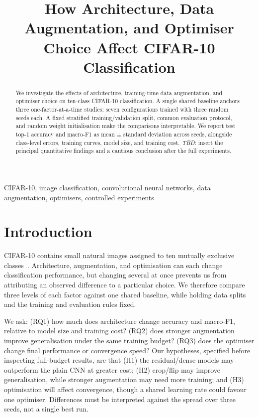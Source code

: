 \documentclass[conference,onecolumn]{IEEEtran}
\title{How Architecture, Data Augmentation, and Optimiser Choice Affect CIFAR-10 Classification}
\author{\IEEEauthorblockN{STUDENT-ID-1 \quad STUDENT-ID-2}
\IEEEauthorblockA{PGR207 Deep Learning, Autumn 2026}}
\newcommand{\tbd}{\textit{TBD}}
\begin{document}
\maketitle

\begin{abstract}
We investigate the effects of architecture, training-time data augmentation,
and optimiser choice on ten-class CIFAR-10 classification. A single shared
baseline anchors three one-factor-at-a-time studies: seven configurations
trained with three random seeds each. A fixed stratified training/validation
split, common evaluation protocol, and random weight initialisation make the
comparisons interpretable. We report test top-1 accuracy and macro-F1 as
mean $\pm$ standard deviation across seeds, alongside class-level errors,
training curves, model size, and training cost. \tbd{}: insert the principal
quantitative findings and a cautious conclusion after the full experiments.
\end{abstract}

\begin{IEEEkeywords}
CIFAR-10, image classification, convolutional neural networks, data
augmentation, optimisers, controlled experiments
\end{IEEEkeywords}

\section{Introduction}
CIFAR-10 contains small natural images assigned to ten mutually exclusive
classes~\cite{cifar10}. Architecture, augmentation, and optimisation can each
change classification performance, but changing several at once prevents us
from attributing an observed difference to a particular choice. We therefore
compare three levels of each factor against one shared baseline, while
holding data splits and the training and evaluation rules fixed.

We ask: (RQ1) how much does architecture change accuracy and macro-F1,
relative to model size and training cost? (RQ2) does stronger augmentation
improve generalisation under the same training budget? (RQ3) does the
optimiser change final performance or convergence speed? Our hypotheses,
specified before inspecting full-budget results, are that (H1) the
residual/dense models may outperform the plain CNN at greater cost; (H2)
crop/flip may improve generalisation, while stronger augmentation may need
more training; and (H3) optimisation will affect convergence, though a
shared learning rate could favour one optimiser. Differences must be
interpreted against the spread over three seeds, not a single best run.
\end{document}
